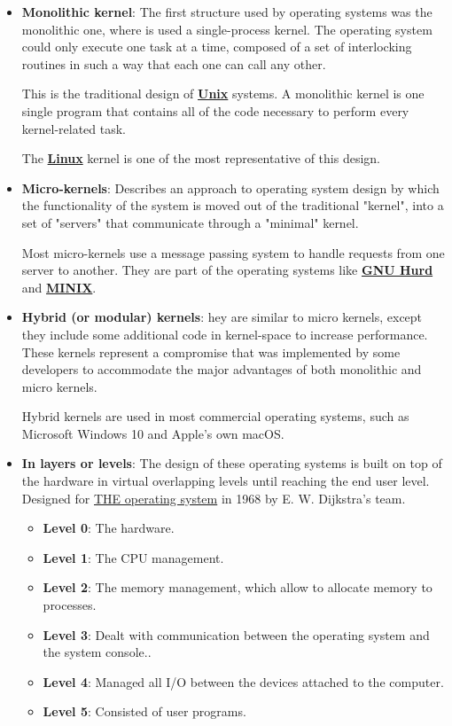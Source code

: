 \begin{itemize}
    \item \textbf{Monolithic kernel}: The first structure used by operating systems was the monolithic one, where is used a single-process kernel. The operating system could only execute one task at a time, composed of a set of interlocking routines in such a way that each one can call any other.

    This is the traditional design of \href{https://en.wikipedia.org/wiki/Unix}{\textbf{Unix}} systems. A monolithic kernel is one single program that contains all of the code necessary to perform every kernel-related task.

    The \textbf{\href{https://en.wikipedia.org/wiki/Linux_kernel}{Linux}} kernel is one of the most representative of this design.

    \item \textbf{Micro-kernels}: Describes an approach to operating system design by which the functionality of the system is moved out of the traditional "kernel", into a set of "servers" that communicate through a "minimal" kernel.

    Most micro-kernels use a message passing system to handle requests from one server to another. They are part of the operating systems like \href{https://en.wikipedia.org/wiki/GNU_Hurd}{\textbf{GNU Hurd}} and \href{https://en.wikipedia.org/wiki/Minix}{\textbf{MINIX}}.

    \item \textbf{Hybrid (or modular) kernels}: hey are similar to micro kernels, except they include some additional code in kernel-space to increase performance. These kernels represent a compromise that was implemented by some developers to accommodate the major advantages of both monolithic and micro kernels.

    Hybrid kernels are used in most commercial operating systems, such as Microsoft Windows 10 and Apple's own macOS.

    \item \textbf{In layers or levels}: The design of these operating systems is built on top of the hardware in virtual overlapping levels until reaching the end user level. Designed for \href{https://en.wikipedia.org/wiki/THE_multiprogramming_system}{THE operating system} in 1968 by E. W. Dijkstra's team.
    \begin{itemize}
        \item \textbf{Level 0}: The hardware.
        \item \textbf{Level 1}: The CPU management.
        \item \textbf{Level 2}: The memory management, which allow to allocate memory to processes.
        \item \textbf{Level 3}: Dealt with communication between the operating system and the system console..
        \item \textbf{Level 4}: Managed all I/O between the devices attached to the computer.
        \item \textbf{Level 5}: Consisted of user programs.
    \end{itemize}



\end{itemize}
